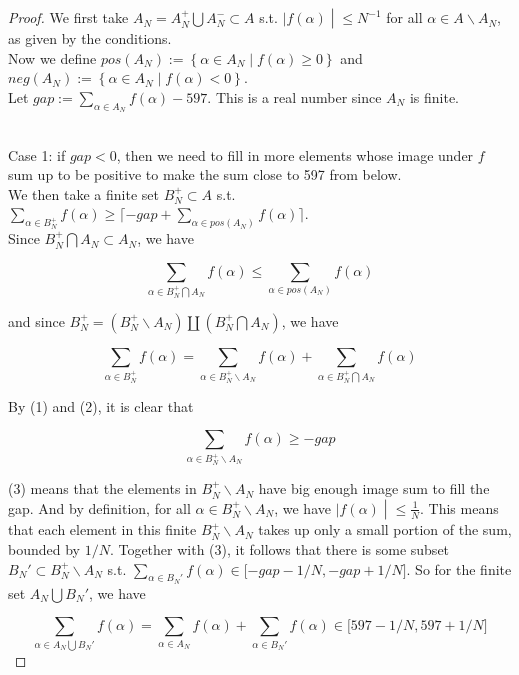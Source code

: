 \documentclass{qlnotes-export}
\begin{document}
\begin{proof}

We first take \(A_{N} = A_{N}^{+}\bigcup A_{N}^{-} \subset A\) s.t. \(\left. |f(\alpha) \middle| \leq N^{- 1} \right.\) for all \(\alpha \in A\backslash A_{N}\), as given by the conditions.\\
Now we define \(pos(A_{N}) := \left\{ {\alpha \in A_{N} \mid f(\alpha) \geq 0} \right\}\) and \(neg(A_{N}) := \left\{ {\alpha \in A_{N} \mid f(\alpha) < 0} \right\}\).\\
Let \(gap := \sum_{\alpha \in A_{N}}f(\alpha) - 597\). This is a real number since \(A_{N}\) is finite.\\
\strut \\
Case 1: if \(gap < 0\), then we need to fill in more elements whose image under \(f\) sum up to be positive to make the sum close to 597 from below.\\
We then take a finite set \(B_{N}^{+} \subset A\) s.t. \(\sum_{\alpha \in B_{N}^{+}}f(\alpha) \geq \lceil - gap + \sum_{\alpha \in pos(A_{N})}f(\alpha)\rceil\).\\
Since \(B_{N}^{+}\bigcap A_{N} \subset A_{N}\), we have

\[\sum\limits_{\alpha \in B_{N}^{+}\bigcap A_{N}}f(\alpha) \leq \sum\limits_{\alpha \in pos(A_{N})}f(\alpha)\]

and since \(B_{N}^{+} = (B_{N}^{+}\backslash A_{N})\coprod(B_{N}^{+}\bigcap A_{N})\), we have

\[\sum\limits_{\alpha \in B_{N}^{+}}f(\alpha) = \sum\limits_{\alpha \in B_{N}^{+}\backslash A_{N}}f(\alpha) + \sum\limits_{\alpha \in B_{N}^{+}\bigcap A_{N}}f(\alpha)\]

By (1) and (2), it is clear that

\[\sum\limits_{\alpha \in B_{N}^{+}\backslash A_{N}}f(\alpha) \geq - gap\]

(3) means that the elements in \(B_{N}^{+}\backslash A_{N}\) have big enough image sum to fill the gap. And by definition, for all \(\alpha \in B_{N}^{+}\backslash A_{N}\), we have \(\left. |f(\alpha) \middle| \leq \frac{1}{N} \right.\). This means that each element in this finite \(B_{N}^{+}\backslash A_{N}\) takes up only a small portion of the sum, bounded by \(1/N\). Together with (3), it follows that there is some subset \(B_{N}' \subset B_{N}^{+}\backslash A_{N}\) s.t. \(\sum_{\alpha \in B_{N}'}f(\alpha) \in \lbrack - gap - 1/N, - gap + 1/N\rbrack\). So for the finite set \(A_{N}\bigcup B_{N}'\), we have

\[\sum\limits_{\alpha \in A_{N}\bigcup B_{N}'}f(\alpha) = \sum\limits_{\alpha \in A_{N}}f(\alpha) + \sum\limits_{\alpha \in B_{N}'}f(\alpha) \in \lbrack 597 - 1/N,597 + 1/N\rbrack\]


\end{proof}
\end{document}

